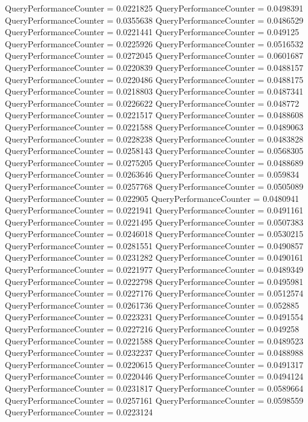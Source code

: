 \documentclass[9pt]{article}
\theoremstyle{plain}
\theoremstyle{definition}
\theoremstyle{remark}
\numberwithin{equation}{section}
\begin{document}
QueryPerformanceCounter  =  0.0221825
QueryPerformanceCounter  =  0.0498391
QueryPerformanceCounter  =  0.0355638
QueryPerformanceCounter  =  0.0486529
QueryPerformanceCounter  =  0.0221441
QueryPerformanceCounter  =  0.049125
QueryPerformanceCounter  =  0.0225926
QueryPerformanceCounter  =  0.0516532
QueryPerformanceCounter  =  0.0272045
QueryPerformanceCounter  =  0.0601687
QueryPerformanceCounter  =  0.0220839
QueryPerformanceCounter  =  0.0488157
QueryPerformanceCounter  =  0.0220486
QueryPerformanceCounter  =  0.0488175
QueryPerformanceCounter  =  0.0218803
QueryPerformanceCounter  =  0.0487341
QueryPerformanceCounter  =  0.0226622
QueryPerformanceCounter  =  0.048772
QueryPerformanceCounter  =  0.0221517
QueryPerformanceCounter  =  0.0488608
QueryPerformanceCounter  =  0.0221588
QueryPerformanceCounter  =  0.0489063
QueryPerformanceCounter  =  0.0228238
QueryPerformanceCounter  =  0.0483828
QueryPerformanceCounter  =  0.0258143
QueryPerformanceCounter  =  0.0568305
QueryPerformanceCounter  =  0.0275205
QueryPerformanceCounter  =  0.0488689
QueryPerformanceCounter  =  0.0263646
QueryPerformanceCounter  =  0.059834
QueryPerformanceCounter  =  0.0257768
QueryPerformanceCounter  =  0.0505089
QueryPerformanceCounter  =  0.022905
QueryPerformanceCounter  =  0.0480941
QueryPerformanceCounter  =  0.0221941
QueryPerformanceCounter  =  0.0491161
QueryPerformanceCounter  =  0.0221495
QueryPerformanceCounter  =  0.0507383
QueryPerformanceCounter  =  0.0246018
QueryPerformanceCounter  =  0.0530215
QueryPerformanceCounter  =  0.0281551
QueryPerformanceCounter  =  0.0490857
QueryPerformanceCounter  =  0.0231282
QueryPerformanceCounter  =  0.0490161
QueryPerformanceCounter  =  0.0221977
QueryPerformanceCounter  =  0.0489349
QueryPerformanceCounter  =  0.0222798
QueryPerformanceCounter  =  0.0495981
QueryPerformanceCounter  =  0.0227176
QueryPerformanceCounter  =  0.0512574
QueryPerformanceCounter  =  0.0261736
QueryPerformanceCounter  =  0.052885
QueryPerformanceCounter  =  0.0223231
QueryPerformanceCounter  =  0.0491554
QueryPerformanceCounter  =  0.0227216
QueryPerformanceCounter  =  0.049258
QueryPerformanceCounter  =  0.0221588
QueryPerformanceCounter  =  0.0489523
QueryPerformanceCounter  =  0.0232237
QueryPerformanceCounter  =  0.0488988
QueryPerformanceCounter  =  0.0220615
QueryPerformanceCounter  =  0.0491317
QueryPerformanceCounter  =  0.0220446
QueryPerformanceCounter  =  0.0494124
QueryPerformanceCounter  =  0.0231817
QueryPerformanceCounter  =  0.0589664
QueryPerformanceCounter  =  0.0257161
QueryPerformanceCounter  =  0.0598559
QueryPerformanceCounter  =  0.0223124
\end{document}
